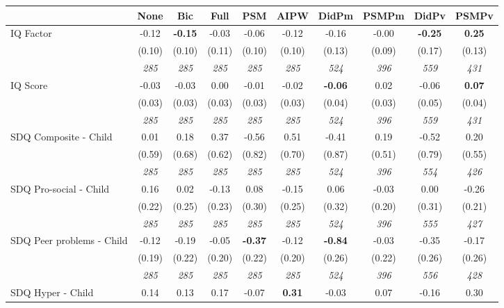 \begin{tabular}{l c c c c c c c c c}
\toprule
 & None & Bic & Full & PSM & AIPW & DidPm & PSMPm & DidPv & PSMPv \\
\midrule
IQ Factor & -0.12 & \textbf{ -0.15 } & -0.03 & -0.06 & -0.12 & -0.16 & -0.00 & \textbf{ -0.25 } & \textbf{0.25} \\
& (0.10) & (0.10) & (0.11) & (0.10) & (0.10) & (0.13) & (0.09) & (0.17) & (0.13) \\
& \textit{ 285 } & \textit{ 285 } & \textit{ 285 } & \textit{ 285 } & \textit{ 285 } & \textit{ 524 } & \textit{ 396 } & \textit{ 559 } & \textit{ 431 } \\
IQ Score & -0.03 & -0.03 & 0.00 & -0.01 & -0.02 & \textbf{ -0.06 } & 0.02 & -0.06 & \textbf{0.07} \\
& (0.03) & (0.03) & (0.03) & (0.03) & (0.03) & (0.04) & (0.03) & (0.05) & (0.04) \\
& \textit{ 285 } & \textit{ 285 } & \textit{ 285 } & \textit{ 285 } & \textit{ 285 } & \textit{ 524 } & \textit{ 396 } & \textit{ 559 } & \textit{ 431 } \\
SDQ Composite - Child & 0.01 & 0.18 & 0.37 & -0.56 & 0.51 & -0.41 & 0.19 & -0.52 & 0.20 \\
& (0.59) & (0.68) & (0.62) & (0.82) & (0.70) & (0.87) & (0.51) & (0.79) & (0.55) \\
& \textit{ 285 } & \textit{ 285 } & \textit{ 285 } & \textit{ 285 } & \textit{ 285 } & \textit{ 524 } & \textit{ 396 } & \textit{ 554 } & \textit{ 426 } \\
SDQ Pro-social - Child & 0.16 & 0.02 & -0.13 & 0.08 & -0.15 & 0.06 & -0.03 & 0.00 & -0.26 \\
& (0.22) & (0.25) & (0.23) & (0.30) & (0.25) & (0.32) & (0.20) & (0.31) & (0.21) \\
& \textit{ 285 } & \textit{ 285 } & \textit{ 285 } & \textit{ 285 } & \textit{ 285 } & \textit{ 524 } & \textit{ 396 } & \textit{ 555 } & \textit{ 427 } \\
SDQ Peer problems - Child & -0.12 & -0.19 & -0.05 & \textbf{-0.37} & -0.12 & \textbf{ -0.84 } & -0.03 & -0.35 & -0.17 \\
& (0.19) & (0.22) & (0.20) & (0.22) & (0.20) & (0.26) & (0.22) & (0.26) & (0.26) \\
& \textit{ 285 } & \textit{ 285 } & \textit{ 285 } & \textit{ 285 } & \textit{ 285 } & \textit{ 524 } & \textit{ 396 } & \textit{ 556 } & \textit{ 428 } \\
SDQ Hyper - Child & 0.14 & 0.13 & 0.17 & -0.07 & \textbf{0.31} & -0.03 & 0.07 & -0.16 & 0.30 \\

\end{tabular}
